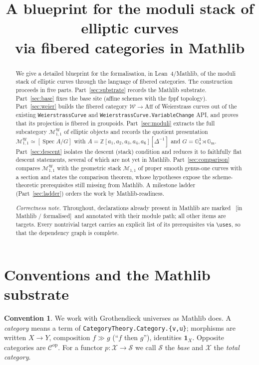 \documentclass[11pt]{article}
\title{\bfseries A blueprint for the moduli stack of elliptic curves\\
       via fibered categories in Mathlib}
\author{}
\date{}
\newcommand{\leanok}{{\footnotesize\textcolor{green!50!black}{\ [in Mathlib / formalised]}}}
\theoremstyle{definition}
\newtheorem{convention}[definition]{Convention}
\theoremstyle{plain}
\theoremstyle{remark}
\newcommand{\Aff}{\mathrm{Aff}}
\newcommand{\Spec}{\operatorname{Spec}}
\newcommand{\op}{\mathrm{op}}
\newcommand{\Weier}{\mathcal{W}}
\newcommand{\MW}{\mathcal{M}^{\mathrm{W}}_{1,1}}
\newcommand{\Mss}{\mathcal{M}_{1,1}}
\newcommand{\Gm}{\mathbb{G}_{\mathrm m}}
\newcommand{\Ga}{\mathbb{G}_{\mathrm a}}
\newcommand{\onel}{\mathbf 1}
\renewcommand{\hom}{\longrightarrow}
\begin{document}
\maketitle

\begin{abstract}
We give a detailed blueprint for the formalisation, in Lean~4/Mathlib, of the
moduli stack of elliptic curves through the language of fibered categories.
The construction proceeds in five parts.  Part~\ref{sec:substrate} records the
Mathlib substrate.  Part~\ref{sec:base} fixes the base site (affine schemes with
the fppf topology).  Part~\ref{sec:weier} builds the fibered category
$\Weier\to\Aff$ of Weierstrass curves out of the existing
\texttt{WeierstrassCurve} and \texttt{WeierstrassCurve.VariableChange} API, and
proves that its projection is fibered in groupoids.  Part~\ref{sec:moduli}
extracts the full subcategory $\MW$ of elliptic objects and records the quotient
presentation $\MW\simeq[\Spec A/G]$ with
$A=\mathbb Z[a_1,a_2,a_3,a_4,a_6][\Delta^{-1}]$ and $G=\Ga^3\rtimes\Gm$.
Part~\ref{sec:descent} isolates the descent (stack) condition and reduces it to
faithfully flat descent statements, several of which are not yet in Mathlib.
Part~\ref{sec:comparison} compares $\MW$ with the geometric stack $\Mss$ of
proper smooth genus-one curves with a section and states the comparison theorem,
whose hypotheses expose the scheme-theoretic prerequisites still missing from
Mathlib.  A milestone ladder (Part~\ref{sec:ladder}) orders the work by
Mathlib-readiness.

\medskip\noindent\emph{Correctness note.}  Throughout, declarations already
present in Mathlib are marked \leanok\ and annotated with their module path; all
other items are targets.  Every nontrivial target carries an explicit list of
its prerequisites via \texttt{\textbackslash uses}, so that the dependency graph
is complete.
\end{abstract}

\tableofcontents

\section{Conventions and the Mathlib substrate}\label{sec:substrate}

\begin{convention}\label{conv:univ}
We work with Grothendieck universes as Mathlib does.  A \emph{category} means a
term of \texttt{CategoryTheory.Category.\{v,u\}}; morphisms are written
$X\hom Y$, composition $f\gg g$ (``$f$ then $g$''), identities $\onel_X$.
Opposite categories are $\mathcal C^{\op}$.  For a functor $p:\mathcal X\to\mathcal S$
we call $\mathcal S$ the \emph{base} and $\mathcal X$ the \emph{total category}.
\end{convention}
\end{document}
